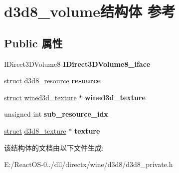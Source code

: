 \hypertarget{structd3d8__volume}{}\section{d3d8\+\_\+volume结构体 参考}
\label{structd3d8__volume}
\subsection*{Public 属性}
\begin{DoxyCompactItemize}
\item 
\mbox{\label{structd3d8__volume_a041fea4c5e74c7ebb49d3bd77e1a23b2}} 
I\+Direct3\+D\+Volume8 {\bfseries I\+Direct3\+D\+Volume8\+\_\+iface}
\item 
\mbox{\label{structd3d8__volume_a50404635888c7c35311c55309846f030}} 
\hyperlink{interfacestruct}{struct} \hyperlink{structd3d8__resource}{d3d8\+\_\+resource} {\bfseries resource}
\item 
\mbox{\label{structd3d8__volume_ae4f6dfeba2b0ad978cd9a834c462f794}} 
\hyperlink{interfacestruct}{struct} \hyperlink{structwined3d__texture}{wined3d\+\_\+texture} $\ast$ {\bfseries wined3d\+\_\+texture}
\item 
\mbox{\label{structd3d8__volume_aa74ef490a83d7296a5f4d96126739196}} 
unsigned int {\bfseries sub\+\_\+resource\+\_\+idx}
\item 
\mbox{\label{structd3d8__volume_af567e151ffdc1c60f950f65255187395}} 
\hyperlink{interfacestruct}{struct} \hyperlink{structd3d8__texture}{d3d8\+\_\+texture} $\ast$ {\bfseries texture}
\end{DoxyCompactItemize}


该结构体的文档由以下文件生成\+:\begin{DoxyCompactItemize}
\item 
E\+:/\+React\+O\+S-\/0../dll/directx/wine/d3d8/d3d8\+\_\+private.\+h\end{DoxyCompactItemize}

